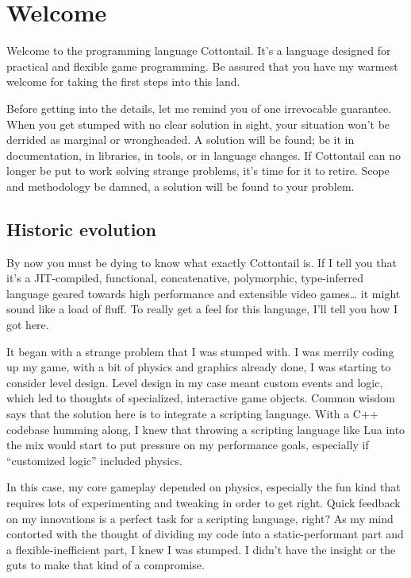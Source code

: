 \chapter{Welcome}

Welcome to the programming language Cottontail. It's a language
designed for practical and flexible game programming. Be assured that
you have my warmest welcome for taking the first steps into this land.

Before getting into the details, let me remind you of one irrevocable
guarantee. When you get stumped with no clear solution in sight, your
situation won't be derrided as marginal or wrongheaded. A solution
will be found; be it in documentation, in libraries, in tools, or in
language changes. If Cottontail can no longer be put to work solving
strange problems, it's time for it to retire. Scope and methodology be
damned, a solution will be found to your problem.


\section{Historic evolution}

By now you must be dying to know what exactly Cottontail is. If I tell
you that it's a JIT-compiled, functional, concatenative, polymorphic,
type-inferred language geared towards high performance and extensible
video games\ldots{} it might sound like a load of fluff. To really get
a feel for this language, I'll tell you how I got here.

It began with a strange problem that I was stumped with. I was merrily
coding up my game, with a bit of physics and graphics already done, I
was starting to consider level design. Level design in my case meant
custom events and logic, which led to thoughts of specialized,
interactive game objects. Common wisdom says that the solution here is
to integrate a scripting language. With a C++ codebase humming along,
I knew that throwing a scripting language like Lua into the mix would
start to put pressure on my performance goals, especially if
``customized logic'' included physics.

In this case, my core gameplay depended on physics, especially the fun
kind that requires lots of experimenting and tweaking in order to get
right. Quick feedback on my innovations is a perfect task for a
scripting language, right? As my mind contorted with the thought of
dividing my code into a static-performant part and a
flexible-inefficient part, I knew I was stumped. I didn't have the
insight or the guts to make that kind of a compromise.

